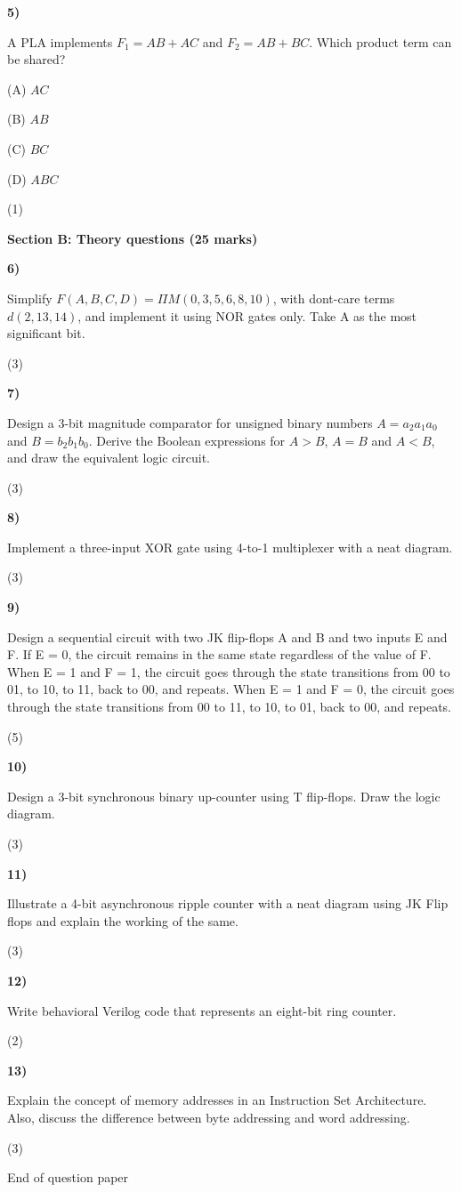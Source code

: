 \documentclass[11pt,a4paper]{article}
\newcommand{\question}[3]{\par\vspace{8pt}\noindent\begin{minipage}[t]{0.075\linewidth}\textbf{#1)}\end{minipage}\begin{minipage}[t]{0.855\linewidth}#3\end{minipage}\hfill\begin{minipage}[t]{0.055\linewidth}\raggedleft(#2)\end{minipage}\par}
\begin{document}
\question{5}{1}{A PLA implements $F_1=AB+AC$ and $F_2=AB+BC$. Which product term can be shared?\par (A) $AC$\par (B) $AB$\par (C) $BC$\par (D) $ABC$}
\newpage\textbf{Section B: Theory questions (25 marks)}\par
\question{6}{3}{Simplify $F(A,B,C,D)=\Pi M(0,3,5,6,8,10)$, with don\textquotesingle t-care terms $d(2,13,14)$, and implement it using NOR gates only. Take A as the most significant bit.}
\question{7}{3}{Design a 3-bit magnitude comparator for unsigned binary numbers $A=a_2a_1a_0$ and $B=b_2b_1b_0$. Derive the Boolean expressions for $A>B$, $A=B$ and $A<B$, and draw the equivalent logic circuit.}
\question{8}{3}{Implement a three-input XOR gate using 4-to-1 multiplexer with a neat diagram.}
\question{9}{5}{Design a sequential circuit with two JK flip-flops A and B and two inputs E and F. If E = 0, the circuit remains in the same state regardless of the value of F. When E = 1 and F = 1, the circuit goes through the state transitions from 00 to 01, to 10, to 11, back to 00, and repeats. When E = 1 and F = 0, the circuit goes through the state transitions from 00 to 11, to 10, to 01, back to 00, and repeats.}
\question{10}{3}{Design a 3-bit synchronous binary up-counter using T flip-flops. Draw the logic diagram.}
\question{11}{3}{Illustrate a 4-bit asynchronous ripple counter with a neat diagram using JK Flip flops and explain the working of the same.}
\question{12}{2}{Write behavioral Verilog code that represents an eight-bit ring counter.}
\question{13}{3}{Explain the concept of memory addresses in an Instruction Set Architecture. Also, discuss the difference between byte addressing and word addressing.}
\vfill\begin{center}\small End of question paper\end{center}
\end{document}

